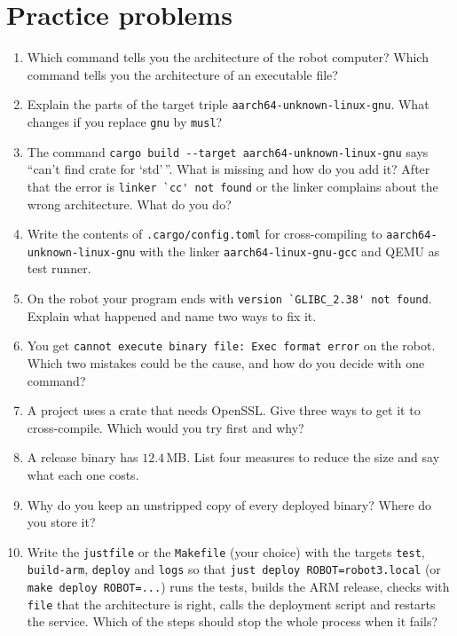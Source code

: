 \section*{Practice problems}
\begin{enumerate}[label=\textbf{\thechapter.\arabic*}]
  \item Which command tells you the architecture of the robot computer? Which command tells you the architecture of an executable file?
  \item Explain the parts of the target triple \verb!aarch64-unknown-linux-gnu!. What changes if you replace \verb!gnu! by \verb!musl!?
  \item The command \verb!cargo build --target aarch64-unknown-linux-gnu! says ``can't find crate for `std'\,''. What is missing and how do you add it? After that the error is \verb!linker `cc' not found! or the linker complains about the wrong architecture. What do you do?
  \item Write the contents of \verb!.cargo/config.toml! for cross-compiling to \verb!aarch64-unknown-linux-gnu! with the linker \verb!aarch64-linux-gnu-gcc! and QEMU as test runner.
  \item On the robot your program ends with \verb!version `GLIBC_2.38' not found!. Explain what happened and name two ways to fix it.
  \item You get \verb!cannot execute binary file: Exec format error! on the robot. Which two mistakes could be the cause, and how do you decide with one command?
  \item A project uses a crate that needs OpenSSL. Give three ways to get it to cross-compile. Which would you try first and why?
  \item A release binary has $12.4$\,MB. List four measures to reduce the size and say what each one costs.
  \item Why do you keep an unstripped copy of every deployed binary? Where do you store it?
  \item[\textbf{\thechapter.10}$\star$] Write the \verb!justfile! or the \verb!Makefile! (your choice) with the targets \verb!test!, \verb!build-arm!, \verb!deploy! and \verb!logs! so that \verb!just deploy ROBOT=robot3.local! (or \verb!make deploy ROBOT=...!) runs the tests, builds the ARM release, checks with \verb!file! that the architecture is right, calls the deployment script and restarts the service. Which of the steps should stop the whole process when it fails?
\end{enumerate}
